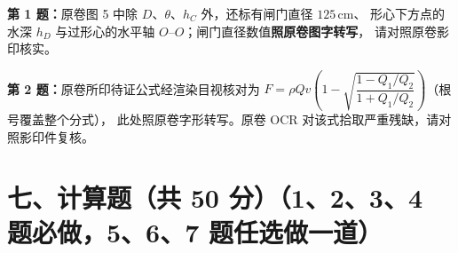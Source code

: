 \begin{tishi}
\textbf{第 1 题：}原卷图 5 中除 $D$、$\theta$、$h_C$ 外，还标有闸门直径 $125\,\mathrm{cm}$、
形心下方点的水深 $h_D$ 与过形心的水平轴 $O$--$O$；闸门直径数值\textbf{照原卷图字转写}，
请对照原卷影印核实。

\textbf{第 2 题：}原卷所印待证公式经渲染目视核对为
$F=\rho Qv\left(1-\sqrt{\dfrac{1-Q_1/Q_2}{1+Q_1/Q_2}}\right)$（根号覆盖整个分式），
此处照原卷字形转写。原卷 OCR 对该式拾取严重残缺，请对照影印件复核。
\end{tishi}

\section{七、计算题（共 50 分）（1、2、3、4 题必做，5、6、7 题任选做一道）}

